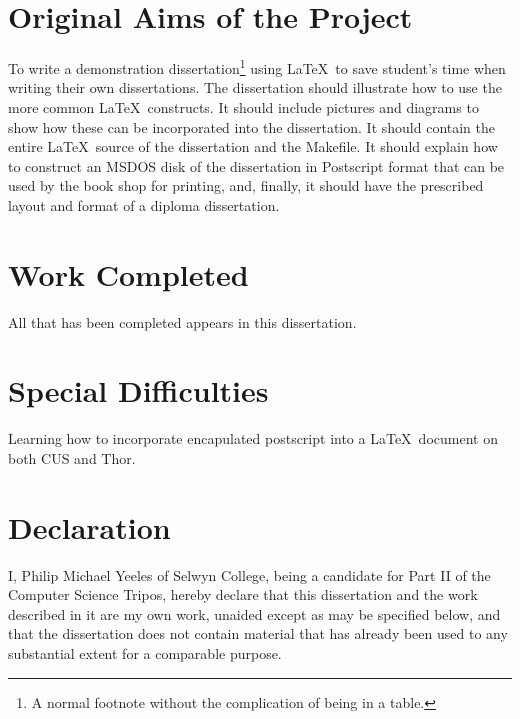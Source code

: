 \documentclass[12pt,twoside,notitlepage]{report}
\begin{document}
\section*{Original Aims of the Project}

To write a demonstration dissertation\footnote{A normal footnote without the
complication of being in a table.} using \LaTeX\ to save
student's time when writing their own dissertations. The dissertation
should illustrate how to use the more common \LaTeX\ constructs. It
should include pictures and diagrams to show how these can be
incorporated into the dissertation.  It should contain the entire
\LaTeX\ source of the dissertation and the Makefile.  It should
explain how to construct an MSDOS disk of the dissertation in
Postscript format that can be used by the book shop for printing, and,
finally, it should have the prescribed layout and format of a diploma
dissertation.


\section*{Work Completed}

All that has been completed appears in this dissertation.

\section*{Special Difficulties}

Learning how to incorporate encapulated postscript into a \LaTeX\
document on both CUS and Thor.

\newpage
\section*{Declaration}

I, Philip Michael Yeeles of Selwyn College, being a candidate for Part
II of the Computer Science Tripos, hereby declare that this dissertation
and the work described in it are my own work, unaided except as may be
specified below, and that the dissertation does not contain material
that has already been used to any substantial extent for a comparable
purpose.

\bigskip
{}

\medskip
{}

\cleardoublepage

\tableofcontents

\listoffigures
\end{document}
